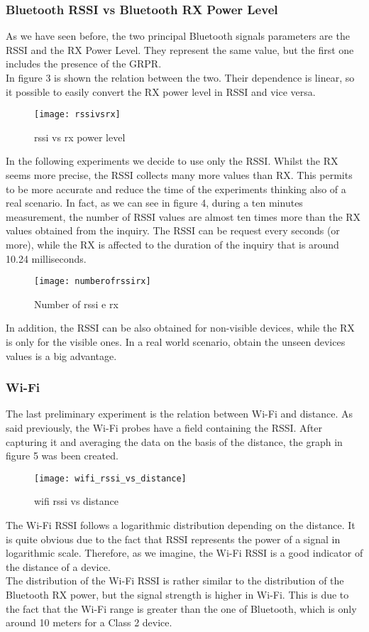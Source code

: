 \subsubsection{Bluetooth RSSI vs Bluetooth RX Power Level}
As we have seen before, the two principal Bluetooth signals parameters are the RSSI and the RX Power Level. 
They represent the same value, but the first one includes the presence of the GRPR. \\
In figure 3 is shown the relation between the two. Their dependence is linear, so it possible to easily convert the RX power level in RSSI  and vice versa.
\begin{figure}[H]
\centering
\texttt{[image: rssivsrx]}
\caption{rssi vs rx power level}
\end{figure}
In the following experiments we decide to use only the RSSI. Whilst the RX seems more precise, the RSSI collects many more values than RX. This permits to be more accurate and reduce the time of the experiments thinking also of a real scenario. In fact, as we can see in figure 4,  during a ten minutes measurement, the number of RSSI values are almost ten times more than the RX values obtained from the inquiry. The RSSI can be request every seconds (or more), while the RX is affected to the duration of the inquiry that is around 10.24 milliseconds.
\begin{figure}[H]
\centering
\texttt{[image: numberofrssirx]}
\caption{Number of rssi e rx}
\end{figure}

In addition, the RSSI can be also obtained for non-visible devices, while the RX is only for the visible ones. In a real world scenario, obtain the unseen devices values is a big advantage.



\subsubsection{Wi-Fi}
The last preliminary experiment is the relation between Wi-Fi and distance. As said previously, the Wi-Fi probes have a field containing the RSSI. After capturing it and averaging the data on the basis of the distance, the graph in figure 5 was been created.
\begin{figure}[H]
\centering
\texttt{[image: wifi\_rssi\_vs\_distance]}
\caption{wifi rssi vs distance}
\end{figure}
The Wi-Fi RSSI follows a logarithmic distribution depending on the distance. It is quite obvious due to the fact that RSSI represents the power of a signal in logarithmic scale. Therefore, as we imagine, the Wi-Fi RSSI is a good indicator of the distance of a device.\\
The distribution of the Wi-Fi RSSI is rather similar to the distribution of the Bluetooth RX power, but the signal strength is higher in Wi-Fi. This is due to the fact that the Wi-Fi range is greater than the one of Bluetooth, which is only around 10 meters for a Class 2 device.


